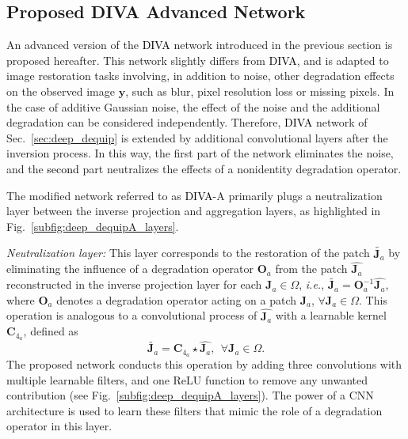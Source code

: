 \documentclass[10pt,journal,compsoc]{IEEEtran}
\newcommand{\sd}{\textcolor{black}}
\newcommand{\dk}{\textcolor{black}}
\def\bsy{{\boldsymbol{y}}}
\def\bsJ{{\boldsymbol{J}}}
\def\bsC{{\boldsymbol{C}}}
\def\bsO{{\boldsymbol{O}}}
\begin{document}
\subsection{Proposed DIVA Advanced Network}
\label{sec:deep_dequipa}
An advanced version of the \dk{DIVA} network introduced in the previous section is proposed hereafter. This network slightly differs from \dk{DIVA}, and is adapted to image restoration tasks involving, in addition to noise, other degradation effects on the observed image $\bsy$, such as blur, pixel resolution loss or missing pixels. In the case of additive Gaussian noise, the effect of the noise and the additional degradation can be considered independently. Therefore, \dk{DIVA} network of Sec.~\ref{sec:deep_dequip} is extended by additional convolutional layers after the inversion process. In this way, the first part of the network eliminates the noise, and the \sd{second} part neutralizes the effects of a nonidentity degradation operator.



The modified network referred to as \dk{DIVA}-A primarily plugs a neutralization layer between the inverse projection and aggregation layers, as highlighted in Fig.~\ref{subfig:deep_dequipA_layers}.


\textit{Neutralization layer:}
This layer corresponds to the restoration of the patch $\tilde{\bsJ_a}$ by eliminating the influence of a degradation operator $\bsO_a$ from the patch $\hat{\bsJ_a}$ reconstructed in the inverse projection layer for each $\bsJ_a \in \Omega$, \textit{i.e.}, $\tilde{\bsJ_a} = \bsO_a^{-1} \hat{\bsJ_a}$, where $\bsO_a$ denotes a degradation operator acting on a patch $\bsJ_a$, $\forall \bsJ_a \in \Omega$. This operation is analogous to a convolutional process of $\hat{\bsJ_a}$ with a learnable kernel $\bsC_{4_a}$, defined as
\begin{equation}
\tilde{\bsJ_a} = \bsC_{4_a} \star \hat{\bsJ_a}, ~~\forall \bsJ_a \in \Omega.
\label{eq:neutraliza}
\end{equation}
The proposed network conducts this operation by adding three convolutions with multiple learnable filters, and one ReLU function to remove any unwanted contribution (see Fig.~\ref{subfig:deep_dequipA_layers}). The power of a CNN architecture is used to learn these filters that mimic the role of a degradation operator in this layer.
\end{document}
